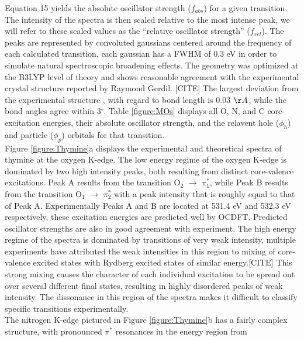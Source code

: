 \documentclass[11.5pt]{article}
\begin{document}
Equation 15 yields the absolute oscillator strength ($f_{abs}$) for a given transition. The intensity of the spectra is then scaled relative to the most intense peak, we will refer to these scaled values as the ``relative oscillator strength'' ($f_{rel}$). The peaks are represented by convoluted gaussians centered around the frequency of each calculated transition, each gaussian has a FWHM of 0.3 eV in order to simulate natural spectroscopic broadening effects.  The geometry was optimized at the B3LYP level of theory and shows reasonable agreement with the experimental crystal structure reported by Raymond Gerdil. [CITE] The largest deviation from the experimental structure , with regard to bond length is 0.03 $\AA$, while the bond angles agree within 3$^{\circ}$. Table \ref{figure:MOs} displays all O, N, and C core-excitation energies, their absolute oscillator strength, and the relavent hole ($\phi_h$) and particle ($\phi_p$) orbitals for that transition. \\
Figure \ref{figure:Thymine}a displays the experimental and theoretical spectra of thymine at the oxygen K-edge. The low energy regime of the oxygen K-edge is dominated by two high intensity peaks, both resulting from distinct core-valence excitations. Peak A results from the transition O$_2$ $\rightarrow$ $\pi^*_1$, while Peak B results from the transition O$_1$ $\rightarrow$ $\pi^*_2$ with a peak intensity that is roughly equal to that of Peak A. Experimentally Peaks A and B are located at 531.4 eV and 532.3 eV respectively, these excitation energies are predicted well by OCDFT. Predicted oscillator strengths are also in good agreement with experiment. The high energy regime of the spectra is dominated by transitions of very weak intensity, multiple experiments have attributed the weak intensities in this region to mixing of core-valence excited states with Rydberg excited states of similar energy.[CITE] This strong mixing causes the character of each individual excitation to be spread out over several different final states, resulting in highly disordered peaks of weak intensity. The dissonance in this region of the spectra makes it difficult to classify specific transitions experimentally. \\
The nitrogen K-edge pictured in Figure \ref{figure:Thymine}b has a fairly complex structure, with pronounced $\pi^*$ resonances in the energy region from 
\\ \\
\end{document}
